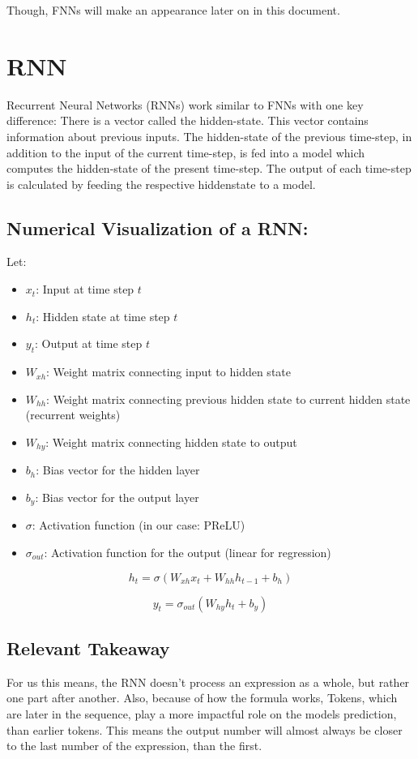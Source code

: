 \documentclass{article}
\begin{document}
Though, FNNs will make an appearance later on in this document.

\section{RNN}

Recurrent Neural Networks (RNNs) work similar to FNNs with one key 
difference: There is a vector called the hidden-state. This vector contains 
information about previous inputs. The hidden-state of the previous 
time-step, in addition to the input of the current time-step, is fed into a 
model which computes the hidden-state of the present time-step. The output 
of each time-step is calculated by feeding the respective hiddenstate to a 
model.


\subsection{Numerical Visualization of a RNN:}
Let:
\begin{itemize}
    \item $x_t$: Input at time step $t$
    \item $h_t$: Hidden state at time step $t$
    \item $y_t$: Output at time step $t$
    \item $W_{xh}$: Weight matrix connecting input to hidden state
    \item $W_{hh}$: Weight matrix connecting previous hidden state to current hidden state (recurrent weights)
    \item $W_{hy}$: Weight matrix connecting hidden state to output
    \item $b_h$: Bias vector for the hidden layer
    \item $b_y$: Bias vector for the output layer
    \item $\sigma$: Activation function (in our case: PReLU)
    \item $\sigma_{out}$: Activation function for the output (linear for regression)
\end{itemize}



$$h_t = \sigma(W_{xh}x_t + W_{hh}h_{t-1} + b_h)$$

$$y_t = \sigma_{out}(W_{hy}h_t + b_y)$$

\subsection{Relevant Takeaway}
For us this means, the RNN doesn't process an expression as a whole, but 
rather one part after another.
Also, because of how the formula works, Tokens, which are later in the 
sequence, play a more impactful role on the models prediction, than earlier 
tokens. This means the output number will almost always be closer to the 
last number of the expression, than the first.
\end{document}
